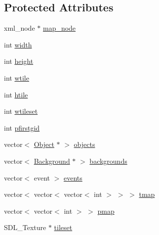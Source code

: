 \subsection*{Protected Attributes}
\begin{DoxyCompactItemize}
\item 
xml\-\_\-node $\ast$ \hyperlink{class_room_a865810da64fc41a3a0858e4e7b5b5241}{map\-\_\-node}
\item 
int \hyperlink{class_room_a0c68c6762e7d93eb459ba552dadaf308}{width}
\item 
int \hyperlink{class_room_ab7d56b80d9eeefca79a2e83447ad4d66}{height}
\item 
int \hyperlink{class_room_ac2d78d3f1097249ae3a447ebe907ed9c}{wtile}
\item 
int \hyperlink{class_room_a2925415ce7fb199e496ad61b77e256cb}{htile}
\item 
int \hyperlink{class_room_aa5480a57c054045be3c677e43e358357}{wtileset}
\item 
int \hyperlink{class_room_ac6125cd56db3bf38d2f44158159b3899}{pfirstgid}
\item 
vector$<$ \hyperlink{class_object}{Object} $\ast$ $>$ \hyperlink{class_room_a6495b4a5cd0ea4979fcfbbb27c6b419e}{objects}
\item 
vector$<$ \hyperlink{class_background}{Background} $\ast$ $>$ \hyperlink{class_room_a2fc816969da445fc7f0bbb3ff7a5ca9f}{backgrounds}
\item 
vector$<$ event $>$ \hyperlink{class_room_a881d5a108a9a3aba5f44279ebbd8a4f9}{events}
\item 
vector$<$ vector$<$ vector$<$ int $>$ $>$ $>$ \hyperlink{class_room_aba520dbf1dd1907f5cdcbc8b6372ec53}{tmap}
\item 
vector$<$ vector$<$ int $>$ $>$ \hyperlink{class_room_a37b095fddfc6230033ed1de7afd9ec8d}{pmap}
\item 
S\-D\-L\-\_\-\-Texture $\ast$ \hyperlink{class_room_a5cd50f4bfda869d4ad45cb52c7e97f5b}{tileset}
\end{DoxyCompactItemize}
